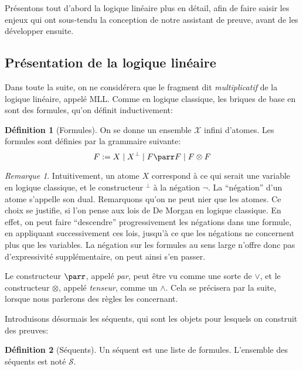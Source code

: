 \documentclass[11pt,a4paper]{article}
\theoremstyle{plain}
\theoremstyle{definition}
\newtheorem{definition}{Définition}
\theoremstyle{remark}
\newtheorem{remark}{Remarque}
\newcommand*{\orth}{^\perp}
\newcommand*{\tensor}{\otimes}
\newcommand*{\sequents}{\ensuremath{\mathcal{S}}}
\begin{document}
Présentons tout d'abord la logique linéaire plus en détail, afin de faire saisir les enjeux qui ont sous-tendu la conception de notre assistant de preuve, avant de les développer ensuite.

\subsection{Présentation de la logique linéaire}
Dans toute la suite, on ne considérera que le fragment dit \emph{multiplicatif} de la logique linéaire, appelé MLL. Comme en logique classique, les briques de base en sont des formules, qu'on définit inductivement:

\begin{definition}[Formules]
On se donne un ensemble $\mathcal{X}$ infini d'atomes. Les formules sont définies par la grammaire suivante:
\begin{equation*}
F := X \mid X\orth \mid F \parr F \mid F \tensor F
\end{equation*}
\end{definition}

\begin{remark}
    Intuitivement, un atome $X$ correspond à ce qui serait une variable en logique classique, et le constructeur $\orth$ à la négation $\neg$. La ``négation'' d'un atome s'appelle son dual. Remarquons qu'on ne peut nier que les atomes. Ce choix se justifie, si l'on pense aux lois de De Morgan en logique classique. En effet, on peut faire ``descendre'' progressivement les négations dans une formule, en appliquant successivement ces lois, jusqu'à ce que les négations ne concernent plus que les variables. La négation sur les formules au sens large n'offre donc pas d'expressivité supplémentaire, on peut ainsi s'en passer.

    Le constructeur $\parr$, appelé \emph{par}, peut être vu comme une sorte de $\lor$, et le constructeur $\tensor$, appelé \emph{tenseur}, comme un $\land$. Cela se précisera par la suite, lorsque nous parlerons des règles les concernant.
\end{remark}

Introduisons désormais les séquents, qui sont les objets pour lesquels on construit des preuves:

\begin{definition}[Séquents]
    Un séquent est une liste de formules. L'ensemble des séquents est noté $\sequents$.
\end{definition}
\end{document}
